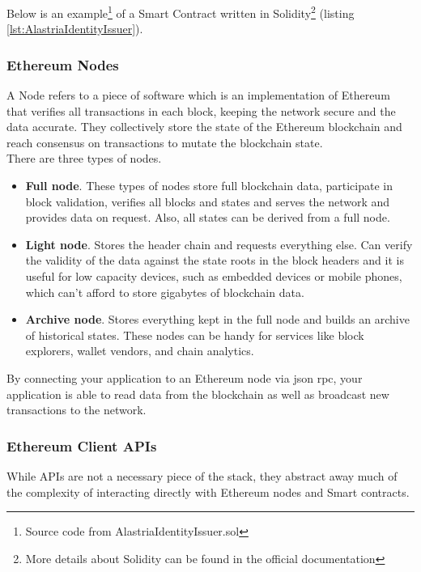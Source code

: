 \documentclass[a4paper, 12pt]{article} %
\begin{document}
            Below is an example\footnote{Source code from AlastriaIdentityIssuer.sol\cite{AlastriaIdentityIssuer}}
 of a Smart Contract written in Solidity\footnote{More details about Solidity can be found in the official documentation\cite{solidity}} (listing  \ref{lst:AlastriaIdentityIssuer}).
            
            

        \subsubsection{Ethereum Nodes}
            A Node refers to a piece of software which is an implementation of Ethereum that verifies all transactions in each block, keeping the network secure and the data accurate. They collectively store the state of the Ethereum blockchain and reach consensus on transactions to mutate the blockchain state.\\
            
            There are three types of nodes.
            \begin{itemize}
                \item \textbf{Full node}. These types of nodes store full blockchain data, participate in block validation, verifies all blocks and states and serves the network and provides data on request. Also, all states can be derived from a full node.
                \item \textbf{Light node}. Stores the header chain and requests everything else. Can verify the validity of the data against the state roots in the block headers and it is useful for low capacity devices, such as embedded devices or mobile phones, which can't afford to store gigabytes of blockchain data.
                \item \textbf{Archive node}. Stores everything kept in the full node and builds an archive of historical states. These nodes can be handy for services like block explorers, wallet vendors, and chain analytics.
            \end{itemize}
            By connecting your application to an Ethereum node via \acrshort{json} \acrshort{rpc}, your application is able to read data from the blockchain as well as broadcast new transactions to the network.

        \subsubsection{Ethereum Client APIs}
            While APIs are not a necessary piece of the stack, they abstract away much of the complexity of interacting directly with Ethereum nodes and Smart contracts.\\
            
\end{document}
